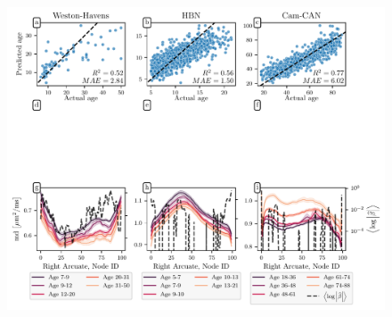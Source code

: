 \documentclass[10pt,letterpaper]{article}
\begin{document}
\begin{figure}
    \vspace{0.0cm}
    \vspace{-6.0cm}
    \includegraphics[width=\textwidth]{regression_scatter.pdf}
    {\label{fig:age-results:wh-scatter}}
    {\label{fig:age-results:hbn-scatter}}
    {\label{fig:age-results:cc-scatter}}

\end{figure}
\end{document}
